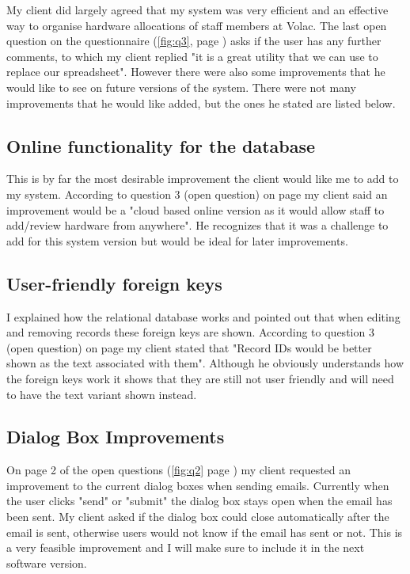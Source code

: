 My client did largely agreed that my system was very efficient and an effective way to organise hardware allocations of staff members at Volac. The last open question on the questionnaire (\ref{fig:q3}, page \pageref{fig:q3}) asks if the user has any further comments, to which my client replied "it is a great utility that we can use to replace our spreadsheet". However there were also some improvements that he would like to see on future versions of the system. There were not many improvements that he would like added, but the ones he stated are listed below.

\subsection{Online functionality for the database}

This is by far the most desirable improvement the client would like me to add to my system. According to question 3 (open question) on page \pageref{fig:q1} my client said an improvement would be a "cloud based online version as it would allow staff to add/review hardware from anywhere". He recognizes that it was a challenge to add for this system version but would be ideal for later improvements.

\subsection{User-friendly foreign keys}

I explained how the relational database works and pointed out that when editing and removing records these foreign keys are shown. According to question 3 (open question) on page \pageref{fig:q1} my client stated that "Record IDs would be better shown as the text associated with them". Although he obviously understands how the foreign keys work it shows that they are still not user friendly and will need to have the text variant shown instead.

\subsection{Dialog Box Improvements}

On page 2 of the open questions (\ref{fig:q2} page \pageref{fig:q2}) my client requested an improvement to the current dialog boxes when sending emails. Currently when the user clicks "send" or "submit" the dialog box stays open when the email has been sent. My client asked if the dialog box could close automatically after the email is sent, otherwise users would not know if the email has sent or not. This is a very feasible improvement and I will make sure to include it in the next software version.


